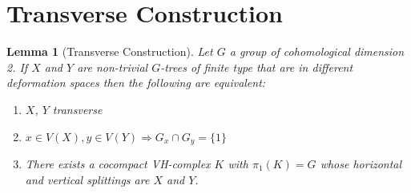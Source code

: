\documentclass{article}
\theoremstyle{mystyle}
\newtheorem{lem}[thm]{Lemma}
\theoremstyle{remark}
\begin{document}
\section{Transverse Construction}
\begin{lem}
    [Transverse Construction]
    \label{pro:transverseconstruction} 
 Let $G$ a group of cohomological dimension 2. If $X$ and $Y$ are non-trivial $G$-trees of finite type that are in different deformation spaces then the following are equivalent:
\begin{enumerate}
    \item $X$, $Y$ transverse
    \item $x \in V(X), y\in V(Y)\Longrightarrow G_x\cap G_y = \{1\}$
    \item There exists a cocompact VH-complex $K$ with $\pi_1(K) = G$ whose horizontal and vertical splittings are $X$ and $Y$.
\end{enumerate}
\end{lem}
\end{document}
